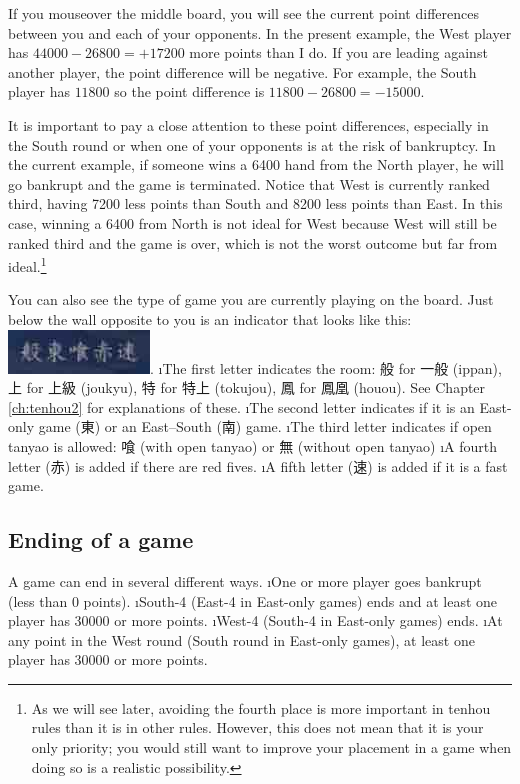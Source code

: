 \bigskip
If you mouseover the middle board, you will see the current point differences between you and each of your opponents. 
In the present example, the West player has $44000 - 26800 = + 17200$ more points than I do. If you are leading against another player, the point difference will be negative. For example, the South player has $11800$ so the point difference is $11800 - 26800 = -15000$. 

\bigskip
It is important to pay a close attention to these point differences, especially in the South round or when one of your opponents is at the risk of bankruptcy. In the current example, if someone wins a 6400 hand from the North player, he will go bankrupt and the game is terminated. Notice that West is currently ranked third, having 7200 less points than South and 8200 less points than East. In this case, winning a 6400 from North is not ideal for West because West will still be ranked third and the game is over, which is not the worst outcome but far from ideal.\footnote{As we will see later, avoiding the fourth place is more important in {\jap tenhou} rules than it is in other rules. However, this does not mean that it is your only priority; you would still want to improve your placement in a game when doing so is a realistic possibility.}

\bigskip

You can also see the type of game you are currently playing on the board. Just below the wall opposite to you is an indicator that looks like this: \includegraphics[width=.2\textwidth,clip]{figs/gametype.jpg}. 
\bi
\i The first letter indicates the room: 般 for 一般 ({\jap ippan}), 上 for 上級 ({\jap joukyu}), 特 for 特上 ({\jap tokujou}), 鳳 for 鳳凰 ({\jap houou}). See Chapter \ref{ch:tenhou2} for explanations of these.
\i The second letter indicates if it is an East-only game (東) or an East--South (南) game.
\i The third letter indicates if open {\jap tanyao} is allowed: 喰 (with open {\jap tanyao}) or 無 (without open {\jap tanyao})
\i A fourth letter (赤) is added if there are red fives.
\i A fifth letter (速) is added if it is a fast game. 
\ei


\subsection{Ending of a game}
A game can end in several different ways. 
\bi
\i One or more player goes bankrupt (less than 0 points). 
\i South-4 (East-4 in East-only games) ends and at least one player has 30000 or more points.
\i West-4 (South-4 in East-only games) ends.
\i At any point in the West round (South round in East-only games), at least one player has 30000 or more points. 
\ei

